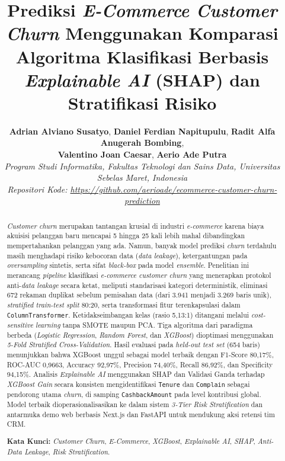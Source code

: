 \documentclass[11pt,a4paper]{article}
\title{\vspace{-1.0cm}\fontsize{15}{19}\selectfont\bfseries
  Prediksi \textit{E-Commerce Customer Churn} Menggunakan Komparasi Algoritma Klasifikasi Berbasis \textit{Explainable AI} (SHAP) dan Stratifikasi Risiko}
\author{
  \fontsize{10.5}{14}\selectfont
  \textbf{Adrian Alviano Susatyo}, \textbf{Daniel Ferdian Napitupulu}, \textbf{Radit Alfa Anugerah Bombing},\\
  \fontsize{10.5}{14}\selectfont
  \textbf{Valentino Joan Caesar}, \textbf{Aerio Ade Putra}\\[4pt]
  \fontsize{9.5}{13}\selectfont\itshape
  Program Studi Informatika, Fakultas Teknologi dan Sains Data, Universitas Sebelas Maret, Indonesia\\
  \fontsize{9}{12}\selectfont
  Repositori Kode: \url{https://github.com/aerioade/ecommerce-customer-churn-prediction}
}
\date{}
\DeclareRobustCommand{\code}[1]{\texttt{\textcolor{CodeColor}{#1}}}
\begin{document}
\maketitle
\thispagestyle{firstpage}
\vspace{-0.6cm}

\begin{abstract}
\noindent\textit{Customer churn} merupakan tantangan krusial di industri \textit{e-commerce} karena biaya akuisisi pelanggan baru mencapai 5 hingga 25 kali lebih mahal dibandingkan mempertahankan pelanggan yang ada. Namun, banyak model prediksi \textit{churn} terdahulu masih menghadapi risiko kebocoran data (\textit{data leakage}), ketergantungan pada \textit{oversampling} sintetis, serta sifat \textit{black-box} pada model \textit{ensemble}. Penelitian ini merancang \textit{pipeline} klasifikasi \textit{e-commerce customer churn} yang menerapkan protokol anti-\textit{data leakage} secara ketat, meliputi standarisasi kategori deterministik, eliminasi 672 rekaman duplikat sebelum pemisahan data (dari 3.941 menjadi 3.269 baris unik), \textit{stratified train-test split} 80:20, serta transformasi fitur terenkapsulasi dalam \code{ColumnTransformer}. Ketidakseimbangan kelas (rasio 5,13:1) ditangani melalui \textit{cost-sensitive learning} tanpa SMOTE maupun PCA. Tiga algoritma dari paradigma berbeda (\textit{Logistic Regression}, \textit{Random Forest}, dan \textit{XGBoost}) dioptimasi menggunakan \textit{5-Fold Stratified Cross-Validation}. Hasil evaluasi pada \textit{held-out test set} (654 baris) menunjukkan bahwa XGBoost unggul sebagai model terbaik dengan F1-Score 80,17\%, ROC-AUC 0,9663, Accuracy 92,97\%, Precision 74,40\%, Recall 86,92\%, dan Specificity 94,15\%. Analisis \textit{Explainable AI} menggunakan SHAP dan Validasi Ganda terhadap \textit{XGBoost Gain} secara konsisten mengidentifikasi \code{Tenure} dan \code{Complain} sebagai pendorong utama \textit{churn}, di samping \code{CashbackAmount} pada level kontribusi global. Model terbaik dioperasionalisasikan ke dalam sistem \textit{3-Tier Risk Stratification} dan antarmuka demo web berbasis Next.js dan FastAPI untuk mendukung aksi retensi tim CRM.

\vspace{6pt}
\noindent\textbf{Kata Kunci:} \textit{Customer Churn}, \textit{E-Commerce}, \textit{XGBoost}, \textit{Explainable AI}, \textit{SHAP}, \textit{Anti-Data Leakage}, \textit{Risk Stratification}.
\end{abstract}
\end{document}
